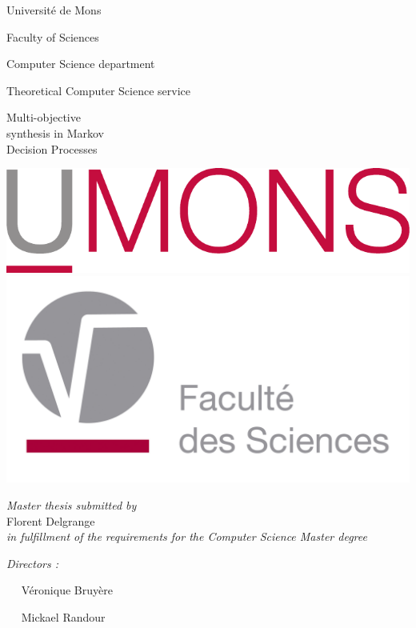 \documentclass[12pt, twoside]{report}
\theoremstyle{definition}%
\theoremstyle{remark}
\newcommand{\umonslogo}{\includegraphics[width=0.25\linewidth]{UMONS.pdf} \hfill                     \includegraphics[width=0.25\linewidth]{UMONS_FS.jpg}
                       }
\newcommand{\HRule}{\rule{\linewidth}{0.3mm}\\} %
\begin{document}
\thispagestyle{title}
{\selectfont
\begin{mdframed}[style=l3style]
\huge Université de Mons
\end{mdframed}
}

\begin{adjustbox}{minipage=.6\textwidth,center}
Faculty of Sciences\par
Computer Science department \par
Theoretical Computer Science service
\end{adjustbox}

\vspace{4em}
\vspace{1em}

{\selectfont
\vspace{0.3em}
\begin{mdframed}[style=l3style]
Multi-objective \\synthesis in Markov \\ Decision Processes
\end{mdframed}
}
\umonslogo

\vspace{4em}


\vspace{.3\linewidth}
\begin{adjustbox}{minipage=.6\textwidth,right}
\large
\begin{flushright}
\textit{Master thesis submitted by}\\Florent Delgrange\\ \textit{in fulfillment of the requirements for the Computer Science Master degree}\par
\end{flushright}
\textit{Directors : } \par $\quad$ Véronique Bruyère\par
$\quad$ Mickael Randour
\end{adjustbox}
\clearpage %
\end{document}
